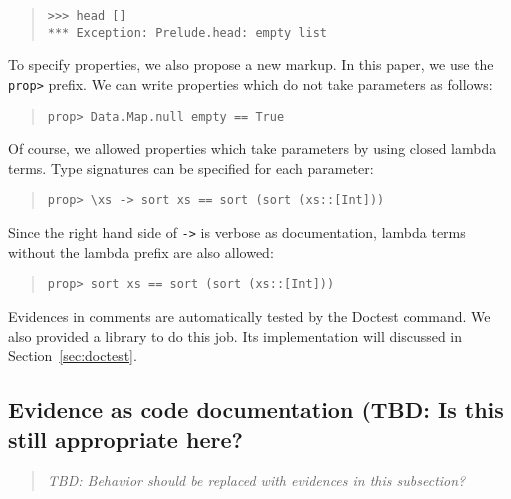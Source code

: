 \documentclass[preprint]{sigplanconf}
\begin{document}
\begin{quote}
\small
\begin{verbatim}
>>> head []
*** Exception: Prelude.head: empty list
\end{verbatim}
\end{quote}

\noindent To specify properties, we also propose a new markup. In this paper, we
use the {\tt prop>} prefix. We can write properties which do not take
parameters as follows:

\begin{quote}
\small
\begin{verbatim}
prop> Data.Map.null empty == True
\end{verbatim}
\end{quote}

\noindent Of course, we allowed properties which take parameters by
using closed lambda terms.
Type signatures can be specified for each parameter:

\begin{quote}
\small
\begin{verbatim}
prop> \xs -> sort xs == sort (sort (xs::[Int]))
\end{verbatim}
\end{quote}

\noindent Since the right hand side of {\tt ->} is verbose as documentation,
lambda terms without the lambda prefix are also allowed:

\begin{quote}
\small
\begin{verbatim}
prop> sort xs == sort (sort (xs::[Int]))
\end{verbatim}
\end{quote}

\noindent Evidences in comments are automatically
tested by the Doctest command. We also provided a library
to do this job. Its implementation will discussed in Section~\ref{sec:doctest}.

\subsection{Evidence as code documentation (TBD: Is this still
appropriate here?}
\label{sec:for-developers}

\begin{quote}
    \emph{TBD: Behavior should be replaced with evidences in this subsection?}
\end{quote}
\end{document}
